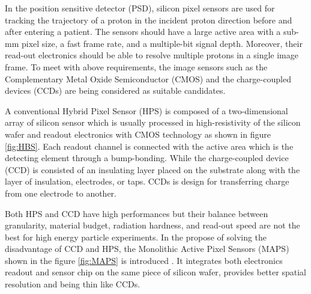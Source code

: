 \documentclass[12pt,a4paper]{article}
\begin{document}
In the position sensitive detector (PSD), silicon pixel sensors are used for tracking the trajectory of a proton in the incident proton direction before and after entering a patient.  The sensors should have a large active area with a sub-mm pixel size, a fast frame rate, and a multiple-bit signal depth. Moreover, their read-out electronics should be able to resolve multiple protons in a single image frame.   To meet with above requirements,  the image sensors such as  the Complementary Metal Oxide Semiconductor (CMOS) \cite{CMOSinPCT} and the charge-coupled devices (CCDs) are being considered as suitable candidates. 

A conventional  Hybrid Pixel Sensor (HPS) is composed of a two-dimensional array of silicon sensor which is usually processed in high-resistivity of the silicon wafer and readout electronics with CMOS technology as shown in figure \ref{fig:HBS}. Each readout channel is connected with the active area which is the detecting element through a bump-bonding\cite{Broennimann:gf0003}.  While the charge-coupled device (CCD) is consisted of an insulating layer placed on the substrate along with the layer of insulation, electrodes, or taps. CCDs is design for transferring charge from one electrode to another.\cite{MATTIS1978355} 

Both HPS and CCD have high performances but their balance between granularity, material budget, radiation hardness, and read-out speed are not the best for high energy particle experiments.  In the propose of solving the disadvantage of CCD and HPS, the Monolithic Active Pixel Sensors (MAPS) shown in the figure \ref{fig:MAPS} is  introduced \cite{TURCHETTA2001677}. It integrates both electronics readout and sensor chip on the same piece of silicon wafer, provides better spatial resolution and being thin like CCDs.\cite{MAPS}
\end{document}
